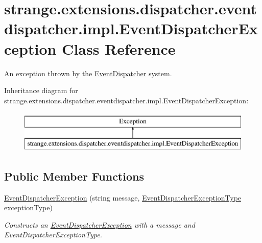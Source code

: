 \hypertarget{classstrange_1_1extensions_1_1dispatcher_1_1eventdispatcher_1_1impl_1_1_event_dispatcher_exception}{\section{strange.\-extensions.\-dispatcher.\-eventdispatcher.\-impl.\-Event\-Dispatcher\-Exception Class Reference}
\label{classstrange_1_1extensions_1_1dispatcher_1_1eventdispatcher_1_1impl_1_1_event_dispatcher_exception}
}


An exception thrown by the \hyperlink{classstrange_1_1extensions_1_1dispatcher_1_1eventdispatcher_1_1impl_1_1_event_dispatcher}{Event\-Dispatcher} system.  


Inheritance diagram for strange.\-extensions.\-dispatcher.\-eventdispatcher.\-impl.\-Event\-Dispatcher\-Exception\-:\begin{figure}[H]
\begin{center}
\leavevmode
\includegraphics[height=2.000000cm]{classstrange_1_1extensions_1_1dispatcher_1_1eventdispatcher_1_1impl_1_1_event_dispatcher_exception}
\end{center}
\end{figure}
\subsection*{Public Member Functions}
\begin{DoxyCompactItemize}
\item 
\hypertarget{classstrange_1_1extensions_1_1dispatcher_1_1eventdispatcher_1_1impl_1_1_event_dispatcher_exception_acfd736337797e059596dfd8d36616ca1}{\hyperlink{classstrange_1_1extensions_1_1dispatcher_1_1eventdispatcher_1_1impl_1_1_event_dispatcher_exception_acfd736337797e059596dfd8d36616ca1}{Event\-Dispatcher\-Exception} (string message, \hyperlink{namespacestrange_1_1extensions_1_1dispatcher_1_1eventdispatcher_1_1api_ac82e4192fcc43ba5e64f0469a3c7c06d}{Event\-Dispatcher\-Exception\-Type} exception\-Type)}\label{classstrange_1_1extensions_1_1dispatcher_1_1eventdispatcher_1_1impl_1_1_event_dispatcher_exception_acfd736337797e059596dfd8d36616ca1}

\begin{DoxyCompactList}\small\item\em Constructs an \hyperlink{classstrange_1_1extensions_1_1dispatcher_1_1eventdispatcher_1_1impl_1_1_event_dispatcher_exception}{Event\-Dispatcher\-Exception} with a message and Event\-Dispatcher\-Exception\-Type. \end{DoxyCompactList}\end{DoxyCompactItemize}
